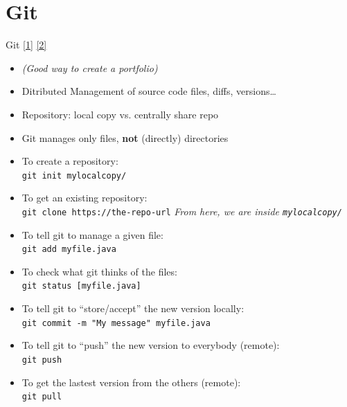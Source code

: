 \documentclass[English,c,%
hyperref={%
    pdftitle={FISA-DE2 OOP in Java},%
    pdfauthor={Muller, Gravier, Laforest, Subercaze},%
    pdfsubject={OOP in Java},%
    pdfkeywords={OOP, Java},%
    colorlinks=true,%
    urlcolor=blue,%
    linkcolor=%
    },%
xcolor={pdftex,svgnames} %
]{beamer}
\begin{document}
\section*{Git}
\begin{frame}{Git \href{https://dzone.com/refcardz/getting-started-git}{[1]} \href{https://git-scm.com/book/en/v2}{[2]}}

{\scriptsize
  \begin{itemize}
    \item \textit{(Good way to create a portfolio)}
    \item Ditributed Management of source code files, diffs, versions\ldots{}
    \item Repository: local copy vs. centrally share repo
    \item Git manages only files, \textbf{not} (directly) directories
    \item To create a repository:\\
    \texttt{git init mylocalcopy/}
    \item To get an existing repository:\\
    \texttt{git clone https://the-repo-url}  \hfill \textit{From here, we are inside \texttt{mylocalcopy/}}
    \bigskip
%
    \item To tell git to manage a given file:\\
    \texttt{git add myfile.java}
    \item To check what git thinks of the files:\\
    \texttt{git status [myfile.java]}
    \item To tell git to ``store/accept'' the new version locally:\\
    \texttt{git commit -m "My message" myfile.java}
    \item To tell git to ``push'' the new version to everybody (remote):\\
    \texttt{git push}
    \item To get the lastest version from the others (remote):\\
    \texttt{git pull}
  \end{itemize}
}
\end{frame}
\end{document}

